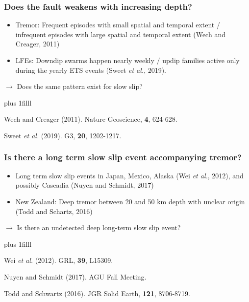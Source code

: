 \documentclass{beamer}
\newcommand{\btVFill}{\vskip0pt plus 1filll}
\begin{document}
	\begin{frame}
		\frametitle{Does the fault weakens with increasing depth?}

		\vspace{2em}

		\begin{itemize}
			\item Tremor: Frequent episodes with small spatial and temporal extent / infrequent episodes with large spatial and temporal extent (Wech and Creager, 2011)
			\item LFEs: Downdip swarms happen nearly weekly / updip families active only during the yearly ETS events (Sweet \textit{et al.}, 2019).
		\end{itemize}
		\begin{block}{}
			$\rightarrow$ Does the same pattern exist for slow slip?
		\end{block}
		\btVFill
		\tiny{Wech and Creager (2011). Nature Geoscience, \textbf{4}, 624-628.

		Sweet \textit{et al.} (2019). G3, \textbf{20}, 1202-1217.}
	\end{frame}


	\begin{frame}
		\frametitle{Is there a long term slow slip event accompanying tremor?}

		\vspace{2em}

		\begin{itemize}
			\item Long term slow slip events in Japan, Mexico, Alaska (Wei \textit{et al.}, 2012), and possibly Cascadia (Nuyen and Schmidt, 2017)
			\item New Zealand: Deep tremor between 20 and 50 km depth with unclear origin (Todd and Schartz, 2016)
		\end{itemize}
		\begin{block}{}
			$\rightarrow$ Is there an undetected deep long-term slow slip event?
		\end{block}
		\btVFill
		\tiny{Wei \textit{et al.} (2012). GRL, \textbf{39}, L15309.

		Nuyen and Schmidt (2017). AGU Fall Meeting.

		Todd and Schwartz (2016). JGR Solid Earth, \textbf{121}, 8706-8719.}
	\end{frame}
\end{document}
